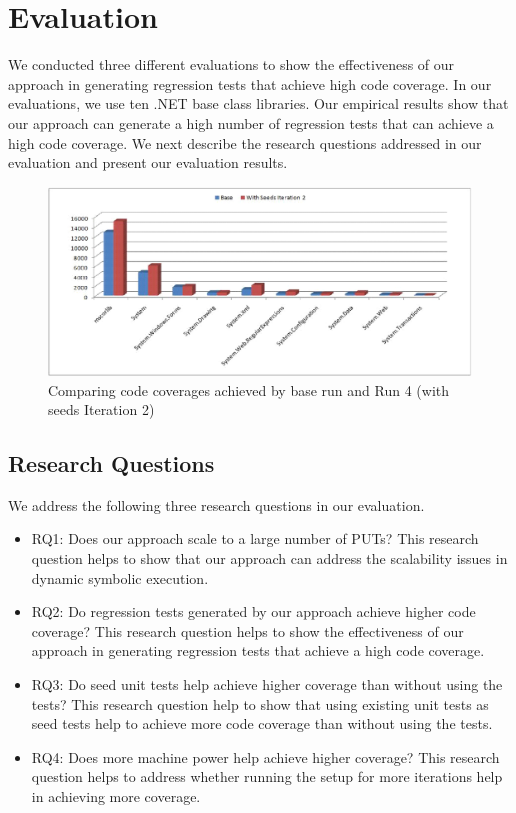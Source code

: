 \section{Evaluation}
\label{sec:eval}

We conducted three different evaluations to show the effectiveness of our approach in
generating regression tests that achieve high code coverage. In our evaluations, we use
ten .NET base class libraries. Our empirical results show that our approach can generate
a high number of regression tests that can achieve a high code coverage. We next describe
the research questions addressed in our evaluation and present our evaluation results.

\begin{figure}[t]
\centering
\includegraphics[scale=0.70,clip]{figs/RQ2_1.eps}\vspace*{-1ex}
\caption{Comparing code coverages achieved by base run and Run 4 (with seeds Iteration 2)} \label{fig:rq2}
\end{figure}

\subsection{Research Questions}
\label{sec:research}

We address the following three research questions in our evaluation.

\begin{itemize}
\item RQ1: Does our approach scale to a large number of PUTs? This research question helps
to show that our approach can address the scalability issues in dynamic symbolic execution.
\item RQ2: Do regression tests generated by our approach achieve higher code coverage? 
This research question helps to show the effectiveness of our approach in generating
regression tests that achieve a high code coverage.
\item RQ3: Do seed unit tests help achieve higher coverage than without using the tests?
This research question help to show that using existing unit tests as seed tests help
to achieve more code coverage than without using the tests.
\item RQ4: Does more machine power help achieve higher coverage? This research question
helps to address whether running the setup for more iterations help in achieving more coverage.
\end{itemize}

